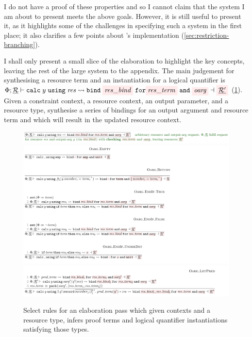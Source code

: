 I do not have a proof of these properties and so I cannot claim that the system
I am about to present meets the above goals. However, it is still useful to
present it, as it highlights some of the challenges in specifying such a system
in the first place; it also clarifies a few points about 's
implementation (\cref{sec:restriction-branching}).

I shall only present a small slice of the elaboration to highlight the key
concepts, leaving the rest of the large system to the appendix. The main
judgement for synthesising a resource term and an instantiation for a logical
quantifier is $\Phi; \underline{\mathcal{R}} \vdash \mathtt{calc}\; y \;
\mathtt{using}\; \mathit{res} \rightsquigarrow \mathtt{bind}\;
\outpol{res\_bind}\; \mathtt{for} \outpol{res\_term} \; \mathtt{and} \;
\outpol{oarg} \dashv \outpol{\underline{\mathcal{R}'}}$
(\cref{fig:elab-res-oarg}). Given a constraint context, a resource context, an
output parameter, and a resource type, synthesise a series of bindings for an
output argument and resource term and which will result in the updated resource
context.

\begin{figure}
    \includegraphics{figures/kernel-elab-calc-1}
    \includegraphics{figures/kernel-elab-calc-2}
    \includegraphics{figures/kernel-elab-calc-3}
    \caption{Select  rules for an elaboration pass which given
        contexts and a resource type, infers proof terms and logical quantifier
        instantiations satisfying those types.}\label{fig:elab-res-oarg}
\end{figure}

